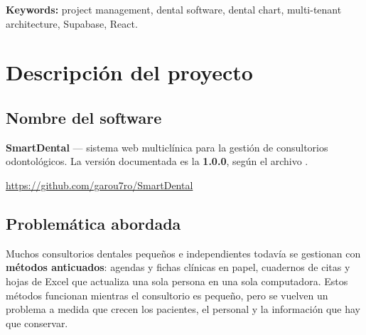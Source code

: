 \documentclass[11pt]{article}
\begin{document}
\textbf{Keywords:} project management, dental software, dental chart, multi-tenant architecture, Supabase, React.

\clearpage
\tableofcontents
\clearpage
\listoffigures
\listoftables
\clearpage
{}

\section{Descripción del proyecto}

\subsection{Nombre del software}

\textbf{SmartDental} — sistema web multiclínica para la gestión de consultorios odontológicos. La versión documentada es la \textbf{1.0.0}, según el archivo .

\begin{sdnota}
\url{https://github.com/garou7ro/SmartDental}
\end{sdnota}

\subsection{Problemática abordada}

Muchos consultorios dentales pequeños e independientes todavía se gestionan con \textbf{métodos anticuados}: agendas y fichas clínicas en papel, cuadernos de citas y hojas de Excel que actualiza una sola persona en una sola computadora. Estos métodos funcionan mientras el consultorio es pequeño, pero se vuelven un problema a medida que crecen los pacientes, el personal y la información que hay que conservar.
\end{document}
